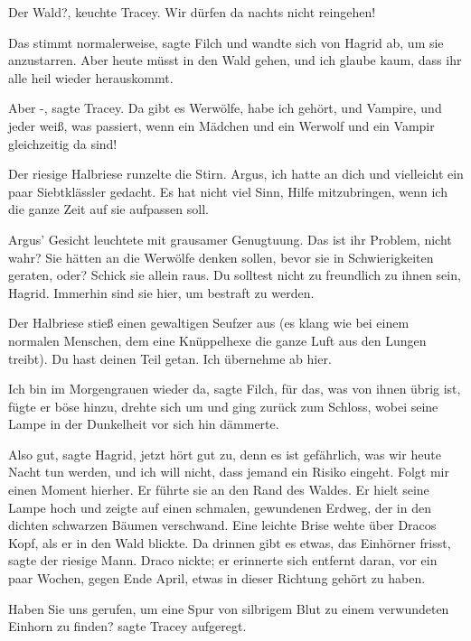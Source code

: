 \glqq Der Wald?\grqq{}, keuchte Tracey. \glqq Wir dürfen da nachts nicht
reingehen!\grqq{}

\glqq Das stimmt normalerweise\grqq{}, sagte Filch und wandte sich von Hagrid
ab, um sie anzustarren. \glqq Aber heute müsst in den Wald gehen, und ich
glaube kaum, dass ihr alle heil wieder herauskommt.\grqq{}

\glqq Aber -\grqq{}, sagte Tracey. \glqq Da gibt es Werwölfe, habe ich gehört,
und Vampire, und jeder weiß, was passiert, wenn ein Mädchen und ein
Werwolf und ein Vampir gleichzeitig da sind!\grqq{}

Der riesige Halbriese runzelte die Stirn. \glqq Argus, ich hatte an dich und
vielleicht ein paar Siebtklässler gedacht. Es hat nicht viel Sinn, Hilfe
mitzubringen, wenn ich die ganze Zeit auf sie aufpassen soll.\grqq{}

Argus' Gesicht leuchtete mit grausamer Genugtuung. \glqq Das ist ihr Problem,
nicht wahr? Sie hätten an die Werwölfe denken sollen, bevor sie in
Schwierigkeiten geraten, oder? Schick sie allein raus. Du solltest nicht
zu freundlich zu ihnen sein, Hagrid. Immerhin sind sie hier, um bestraft
zu werden.\grqq{}

Der Halbriese stieß einen gewaltigen Seufzer aus (es klang wie bei einem
normalen Menschen, dem eine Knüppelhexe die ganze Luft aus den Lungen
treibt). \glqq Du hast deinen Teil getan. Ich übernehme ab hier.\grqq{}

\glqq Ich bin im Morgengrauen wieder da\grqq{}, sagte Filch, \glqq für das, was
von ihnen übrig ist\grqq{}, fügte er böse hinzu, drehte sich um und ging
zurück zum Schloss, wobei seine Lampe in der Dunkelheit vor sich hin
dämmerte.

\glqq Also gut\grqq{}, sagte Hagrid, \glqq jetzt hört gut zu, denn es ist
gefährlich, was wir heute Nacht tun werden, und ich will nicht, dass
jemand ein Risiko eingeht. Folgt mir einen Moment hierher.\grqq{} Er
führte sie an den Rand des Waldes. Er hielt seine Lampe hoch und zeigte
auf einen schmalen, gewundenen Erdweg, der in den dichten schwarzen
Bäumen verschwand. Eine leichte Brise wehte über Dracos Kopf, als er in
den Wald blickte. \glqq Da drinnen gibt es etwas, das Einhörner
frisst\grqq{}, sagte der riesige Mann. Draco nickte; er erinnerte sich
entfernt daran, vor ein paar Wochen, gegen Ende April, etwas in dieser
Richtung gehört zu haben.

\glqq Haben Sie uns gerufen, um eine Spur von silbrigem Blut zu einem
verwundeten Einhorn zu finden?\grqq{} sagte Tracey aufgeregt.

